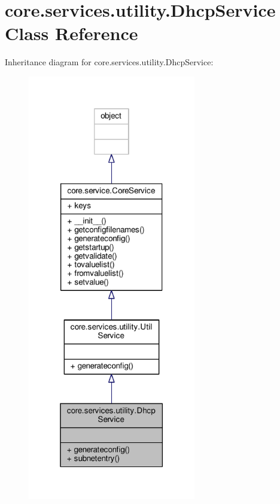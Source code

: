 \hypertarget{classcore_1_1services_1_1utility_1_1_dhcp_service}{\section{core.\+services.\+utility.\+Dhcp\+Service Class Reference}
\label{classcore_1_1services_1_1utility_1_1_dhcp_service}
}


Inheritance diagram for core.\+services.\+utility.\+Dhcp\+Service\+:
\nopagebreak
\begin{figure}[H]
\begin{center}
\leavevmode
\includegraphics[width=208pt]{classcore_1_1services_1_1utility_1_1_dhcp_service__inherit__graph}
\end{center}
\end{figure}


